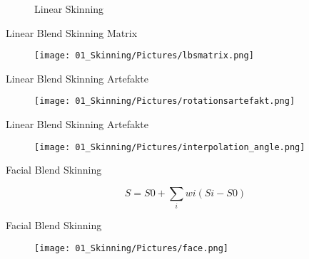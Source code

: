 \begin{frame}{
			\begin{figure}
				\colorbox{black!10}{\Huge{Linear Skinning}}
			\end{figure}
		}
\begin{frame}{\Huge{Linear Blend Skinning Matrix}}
			\begin{figure}
				\texttt{[image: 01\_Skinning/Pictures/lbsmatrix.png]}
			\end{figure}
			
			
			
		\end{frame}
		
		\begin{frame}{\Huge{Linear Blend Skinning Artefakte}}
			
			\begin{figure}
				\texttt{[image: 01\_Skinning/Pictures/rotationsartefakt.png]}
			\end{figure}
			
			
			
		\end{frame}
		
				\begin{frame}{\Huge{Linear Blend Skinning Artefakte}}
					
					\begin{figure}
						\texttt{[image: 01\_Skinning/Pictures/interpolation\_angle.png]}
					\end{figure}
					
					
					
				\end{frame}

	\begin{frame}{\Huge{Facial Blend Skinning}}

		
		$$S=S0+\sum_{i}wi(Si-S0)$$
		
		
	\end{frame}

				\begin{frame}{\Huge{Facial Blend Skinning}}
					
					\begin{figure}
						\texttt{[image: 01\_Skinning/Pictures/face.png]}
					\end{figure}
					

\end{frame}
\end{frame}
